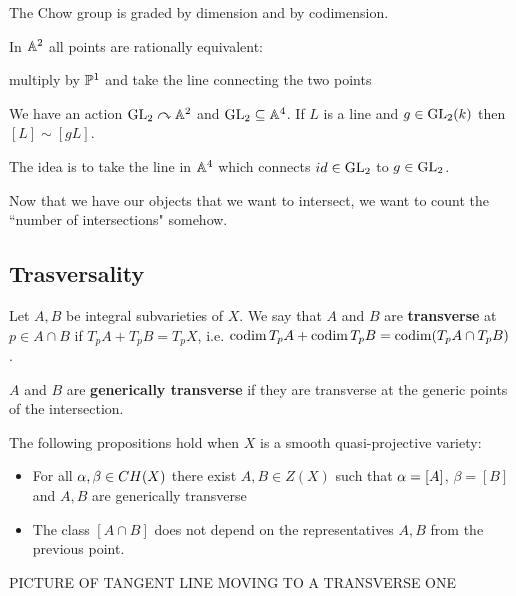 \begin{remark}
The Chow group is graded by dimension and by codimension.
\end{remark}



\begin{example}
In $\mathbb{A}^2$ all points are rationally equivalent:

multiply by $\mathbb{P}^1$ and take the line connecting the two points
\end{example}

\begin{example}
We have an action $\mathrm{GL}_2\curvearrowright \mathbb{A}^2$ and $\mathrm{GL}_2\subseteq \mathbb{A}^4$. If $L$ is a line and $g\in \mathrm{GL}_2(k)$ then $[L]\sim [gL]$.

The idea is to take the line in $\mathbb{A}^4$ which connects $id\in \mathrm{GL}_2$ to $g\in \mathrm{GL}_2$.
\end{example}



Now that we have our objects that we want to intersect, we want to count the ``number of intersections" somehow.


\subsection{Trasversality}

\begin{definition}[]
Let $A,B$ be integral subvarieties of $X$. We say that $A$ and $B$ are \textbf{transverse} at $p\in A\cap B$ if $T_pA+T_pB=T_pX$, i.e. $\operatorname{codim} T_p A+\operatorname{codim} T_p B=\operatorname{codim}(T_pA\cap T_p B)$.


$A$ and $B$ are \textbf{generically transverse} if they are transverse at the generic points of the intersection.
\end{definition}


\begin{lemma}
The following propositions hold when $X$ is a smooth quasi-projective variety:
\begin{itemize}
\item For all $\alpha,\beta\in CH(X)$ there exist $A,B\in Z(X)$ such that $\alpha=[A]$, $\beta=[B]$ and $A,B$ are generically transverse
\item The class $[A\cap B]$ does not depend on the representatives $A,B$ from the previous point.
\end{itemize}
\end{lemma}

PICTURE OF TANGENT LINE MOVING TO A TRANSVERSE ONE


